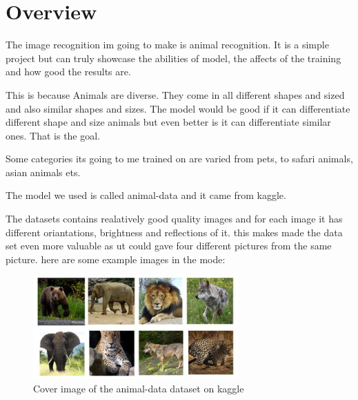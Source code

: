\chapter{Overview}
The image recognition im going to make is animal recognition. It is a simple project but can truly showcase the abilities of model, the affects of the training and how good the results are.

This is because Animals are diverse. They come in all different  shapes and sized and also similar shapes and sizes. The model would be good if it can differentiate different shape and size animals but even better is it can differentiate similar ones. That is the goal.

Some categories its going to me trained on are varied from pets, to safari animals, asian animals ets. 

The model we used is called animal-data\cite{animal-data} and it came from kaggle.

The datasets contains realatively good quality images and for each image it has different oriantations, brightness and reflections of it. this makes made the data set even more valuable as ut could gave four different pictures from the same picture.
here are some example images in the mode:

\begin{figure}[h]
    \centering
    \includegraphics[width = 0.7\textwidth]{Figures/img/dataset-cover.png}
    \caption{Cover image of the animal-data\cite{animal-data} dataset on kaggle}
    \label{fig:label1}
\end{figure}